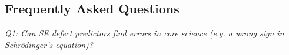 \documentclass{NSF}
\newenvironment{myitemize}
{ \begin{itemize}
    \setlength{\itemsep}{0pt}
    \setlength{\parskip}{0pt}
    \setlength{\parsep}{0pt}     }
{ \end{itemize}                  }
\newcommand{\bi}{\begin{myitemize}}
\newcommand{\ei}{\end{myitemize}}
\newcommand{\tbl}[1]{Table~\ref{tbl:#1}}
\newcommand{\IT}{{\bf {\sffamily SEnTRY}}}
\begin{document}
\begin{nsfdescription}
% 



 





\section{Frequently Asked Questions}\label{tion:faq}
{\em Q1: Can SE defect predictors
 find errors  in core science  (e.g. a wrong
sign in Schr\"{o}dinger's  equation)?}


\end{nsfdescription}
\end{document}

